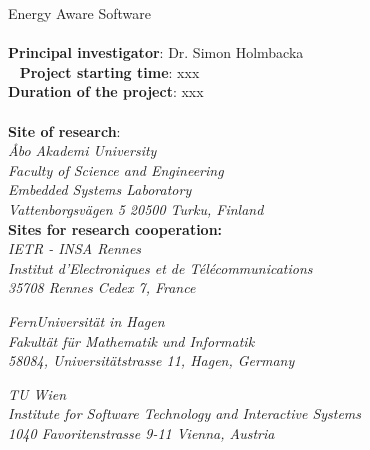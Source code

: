 \documentclass{article}
\begin{document}
\huge{Energy Aware Software}\\\\
\normalsize\textbf{Principal investigator}: Dr. Simon Holmbacka\\ 
\textbf{Project starting time}: xxx\\
\textbf{Duration of the project}: xxx\\\\
\textbf{Site of research}:\\
\textit{\AA{}bo Akademi University} \\
\textit{Faculty of Science and Engineering}\\
\textit{Embedded Systems Laboratory}\\
\textit{Vattenborgsv\"{a}gen 5 20500 Turku, Finland}\\

\textbf{Sites for research cooperation:}\\
\textit{IETR - INSA Rennes\\
Institut d'Electroniques et de T\'{e}l\'{e}communications\\
35708 Rennes Cedex 7, France\\}

\textit{FernUniversit\"{a}t in Hagen\\
Fakult\"{a}t f\"{u}r Mathematik und Informatik\\
58084, Universit\"{a}tstrasse 11, Hagen, Germany\\}

\textit{TU Wien\\
Institute for Software Technology and Interactive Systems\\
1040 Favoritenstrasse 9-11 Vienna, Austria}

\date{\today} %

\end{document}
